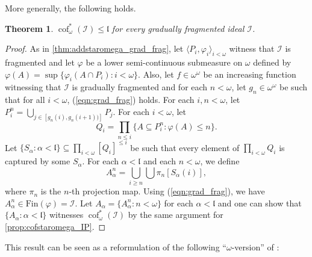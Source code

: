 \documentclass[a4paper,12pt]{amsart}
\newtheorem{thm}{Theorem}
\theoremstyle{definition}
\numberwithin{thm}{section}
\numberwithin{equation}{section}
\DeclareMathOperator{\cof}{cof}
\newcommand{\I}{\mathscr{I}}
\renewcommand{\subset}{\subseteq}
\begin{document}
    More generally, the following holds.

    \begin{thm}\label{thm:cofstaromega_grad_frag}
        $\cof^*_\omega(\I)\leq\mathfrak{l}$ for every gradually fragmented ideal $\I$.
    \end{thm}
    \begin{proof}
        As in \cref{thm:addstaromega_grad_frag}, let $\langle P_i, \varphi_i\rangle_{i<\omega}$ witness that $\I$ is fragmented and  let $\varphi$ be a lower semi-continuous submeasure on $\omega$ defined by $\varphi(A) = \sup\{\varphi_i(A\cap P_i):i<\omega\}$. Also, let $f\in\omega^\omega$ be an increasing function witnessing that $\I$ is gradually fragmented and for each $n<\omega$, let $g_n\in\omega^\omega$ be such that for all $i<\omega$, (\ref{eqn:grad_frag}) holds. For each $i, n<\omega$, let $P^n_i = \bigcup_{j\in[g_n(i), g_n(i+1))]}P_j$. For each $i<\omega$, let
        \[
        Q_i = \prod_{n\leq i}\{A\subset P^n_i:\varphi(A)\leq n\}.
        \]
        Let $\{S_\alpha:\alpha<\mathfrak{l}\}\subset\prod_{i<\omega}[Q_i]^{\leq i}$ be such that every element of $\prod_{i<\omega}Q_i$ is captured by some $S_\alpha$. For each $\alpha<\mathfrak{l}$ and each $n<\omega$, we define
        \[
        A_\alpha^n = \bigcup_{i\geq n} \bigcup\pi_n[S_\alpha(i)],
        \]
        where $\pi_n$ is the $n$-th projection map. Using (\ref{eqn:grad_frag}), we have $A_\alpha^n \in \mathrm{Fin}(\varphi) = \I$. Let $A_\alpha = \{A^n_\alpha:n<\omega\}$ for each $\alpha<\mathfrak{l}$ and one can show that $\{A_\alpha : \alpha<\mathfrak{l}\}$ witnesses $\cof^*_\omega(\I)$ by the same argument for \cref{prop:cofstaromega_IP}.
    \end{proof}

    This result can be seen as a reformulation of the following ``$\omega$-version'' of \cite[Theorem 2.2 \& Proposition 2.3]{HRRZ14}:
\end{document}
